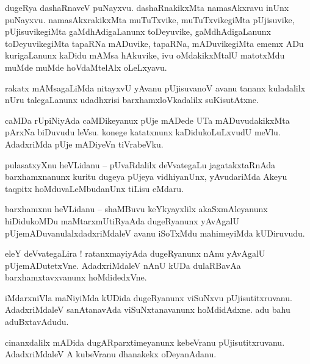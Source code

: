 \documentclass{article}
\begin{document}
\begin{mng}%
dugeRya dashaRnaveV puNayxvu. dashaRnakikxMta namasAkxravu inUnx puNayxvu. namasAkxrakikxMta 
muTuTxvike, muTuTxvikegiMta pUjisuvike, pUjisuvikegiMta gaMdhAdigaLanunx toDeyuvike, 
gaMdhAdigaLanunx toDeyuvikegiMta tapaRNa mADuvike, tapaRNa, mADuvikegiMta ememx ADu kurigaLanunx 
kaDidu mAMsa hAkuvike, ivu oMdakikxMtalU matotxMdu muMde muMde hoVdaMtelAlx oLeLxyavu.
\end{mng}

\begin{mng}%
rakatx mAMsagaLiMda nitayxvU yAvanu pUjisuvanoV avanu tananx kuladalilx nUru talegaLanunx 
udadhxrisi barxhamxloVkadalilx suKisutAtxne.
\end{mng}

\begin{mng}%
caMDa rUpiNiyAda caMDikeyanux pUje mADede UTa mADuvudakikxMta pArxNa biDuvudu leVsu. konege 
katatxnunx kaDidukoLuLxvudU meVlu. AdadxriMda pUje mADiyeVn tiVrabeVku.
\end{mng}


\begin{mng}%
pulasatxyXnu heVLidanu -- pUvaRdalilx deVvategaLu jagatakxtaRnAda barxhamxnanunx kuritu dugeya 
pUjeya vidhiyanUnx, yAvudariMda Akeyu taqpitx hoMduvaLeMbudanUnx tiLisu eMdaru.
\end{mng}

\begin{mng}%
barxhamxnu heVLidanu -- shaMBuvu keYkyayxlilx akaSxmAleyanunx hiDidukoMDu maMtarxmUtiRyaAda 
dugeRyanunx yAvAgalU pUjemADuvanulalxdadxriMdaleV avanu iSoTxMdu mahimeyiMda kUDiruvudu.
\end{mng}

\begin{mng}%
eleY deVvategaLira ! ratanxmayiyAda dugeRyanunx nAnu yAvAgalU pUjemADutetxVne. AdadxriMdaleV nAnU 
kUDa dulaRBavAa barxhamxtavxvanunx hoMdidedxVne.
\end{mng}

\begin{mng}%
iMdarxniVla maNiyiMda kUDida dugeRyanunx viSuNxvu pUjisutitxruvanu. AdadxriMdaleV sanAtanavAda 
viSuNxtanavanunx hoMdidAdxne. adu bahu aduBxtavAdudu.
\end{mng}

\begin{mng}%
cinanxdalilx mADida dugARparxtimeyanunx kebeVranu pUjisutitxruvanu. AdadxriMdaleV A kubeVranu 
dhanakekx oDeyanAdanu.
\end{mng}
\end{document}
